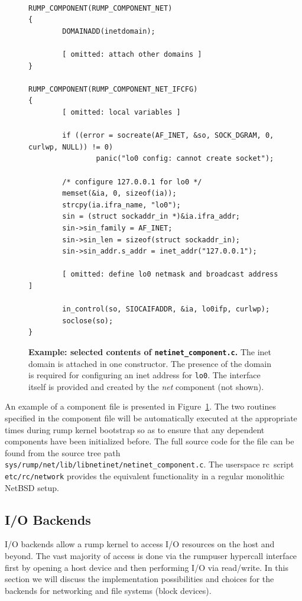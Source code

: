 \begin{figure}
{\tt \scriptsize  
\begin{verbatim}
RUMP_COMPONENT(RUMP_COMPONENT_NET)
{
        DOMAINADD(inetdomain);

        [ omitted: attach other domains ]
}

RUMP_COMPONENT(RUMP_COMPONENT_NET_IFCFG)
{
        [ omitted: local variables ]

        if ((error = socreate(AF_INET, &so, SOCK_DGRAM, 0, curlwp, NULL)) != 0)
                panic("lo0 config: cannot create socket");

        /* configure 127.0.0.1 for lo0 */
        memset(&ia, 0, sizeof(ia));
        strcpy(ia.ifra_name, "lo0");
        sin = (struct sockaddr_in *)&ia.ifra_addr;
        sin->sin_family = AF_INET;
        sin->sin_len = sizeof(struct sockaddr_in);
        sin->sin_addr.s_addr = inet_addr("127.0.0.1");

        [ omitted: define lo0 netmask and broadcast address ]

        in_control(so, SIOCAIFADDR, &ia, lo0ifp, curlwp);
        soclose(so);
}
\end{verbatim}}
\caption[Example: selected contents of \texttt{netinet\_component.c}]{
\textbf{Example: selected contents of \texttt{netinet\_component.c}.}
The inet domain is attached in one constructor.
The presence of the domain is required for configuring an inet address
for \texttt{lo0}.  The interface itself is provided and created by the
\textit{net} component (not shown).
}
\label{fig:component.c}
\end{figure}

An example of a component file is presented in
Figure~\ref{fig:component.c}.  The two routines specified in the
component file will be automatically executed at the appropriate
times during rump kernel bootstrap so as to ensure that any
dependent components have been initialized before.  The full source
code for the file can be found from the source tree path
\verb+sys/rump/net/lib/libnetinet/netinet_component.c+.  The
userspace rc~script \texttt{etc/rc/network} provides the equivalent
functionality in a regular monolithic NetBSD setup.


\subsection{I/O Backends}
\label{sect:iobackend}

I/O backends allow a rump kernel to access I/O resources on the host
and beyond.  The vast majority of access is done via the rumpuser
hypercall interface first by opening a host device and then performing
I/O via read/write.  In this section we will discuss the implementation
possibilities and choices for the backends for networking and 
file systems (block devices).

